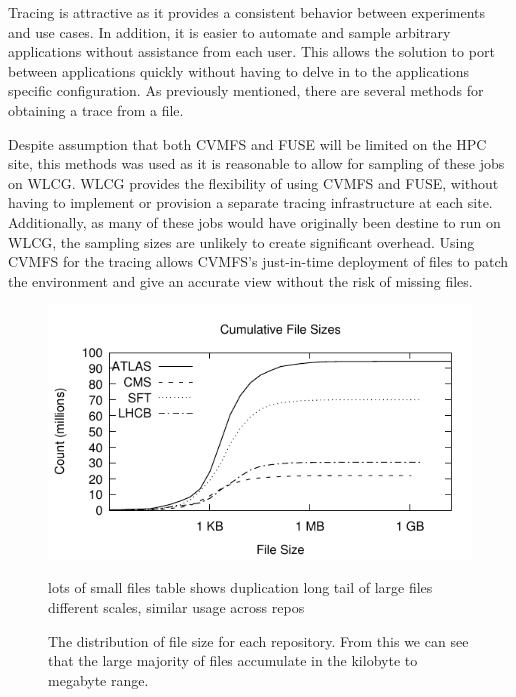 \documentclass[sigconf]{acmart}
\begin{document}
Tracing is attractive as it provides a consistent 
behavior between experiments and use cases.
In addition, it is easier to automate and sample arbitrary applications without assistance from each user.
This allows the solution to port between applications
quickly without having to delve in to the applications
specific configuration.
As previously mentioned, there are several methods for
obtaining a trace from a file.

Despite assumption that both CVMFS and FUSE will be limited
on the HPC site, this methods was used as it is reasonable to
allow for sampling of these jobs on WLCG. 
WLCG provides the flexibility of using CVMFS and FUSE, without
having to implement or provision a separate tracing infrastructure
at each site.
Additionally, as many of these jobs would have originally been 
destine to run on WLCG, the sampling sizes are unlikely to 
create significant overhead.
Using CVMFS for the tracing allows CVMFS's just-in-time deployment
of files to patch the environment and give an accurate view without
the risk of missing files.

\begin{figure}
\includegraphics[width=\linewidth]{curated/cdf/cdf.pdf}
\caption{The distribution of file size for each repository.
From this we can see that the large majority of files
accumulate in the kilobyte to megabyte range.}
\label{fig:cdf}
lots of small files
table shows duplication
long tail of large files
different scales, similar usage across repos

\fi
\end{figure}
\end{document}
